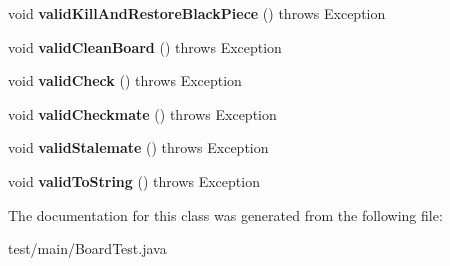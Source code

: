\begin{DoxyCompactItemize}
\item 
\mbox{\label{classmain_1_1_board_test_a6887114b7e9331de7e8d2ff785a34155}} 
void {\bfseries valid\+Kill\+And\+Restore\+Black\+Piece} ()  throws Exception 
\item 
\mbox{\label{classmain_1_1_board_test_a1bc061923f45b4ac588ae6168f591fc3}} 
void {\bfseries valid\+Clean\+Board} ()  throws Exception 
\item 
\mbox{\label{classmain_1_1_board_test_af90af7e2e898b8ca4123fcf8e9149add}} 
void {\bfseries valid\+Check} ()  throws Exception 
\item 
\mbox{\label{classmain_1_1_board_test_af34a661e465fac4e320ecb3374b4f934}} 
void {\bfseries valid\+Checkmate} ()  throws Exception 
\item 
\mbox{\label{classmain_1_1_board_test_a5707e9e260e592d0dd97e1c60989c6f4}} 
void {\bfseries valid\+Stalemate} ()  throws Exception 
\item 
\mbox{\label{classmain_1_1_board_test_a1e5690b5e8d8cdb55801069dcfd01031}} 
void {\bfseries valid\+To\+String} ()  throws Exception 
\end{DoxyCompactItemize}


The documentation for this class was generated from the following file\+:\begin{DoxyCompactItemize}
\item 
test/main/Board\+Test.\+java\end{DoxyCompactItemize}
